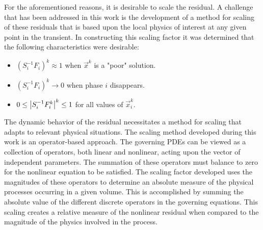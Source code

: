 For the aforementioned reasons, it is desirable to scale the residual.
A challenge that has been addressed in this work is the development of a method for scaling of these residuals that is based upon the local physics of interest at any given point in the transient.
In constructing this scaling factor it was determined that the following characteristics were desirable:

\begin{itemize}
\item{$(S_{i}^{-1} F_i)^{k} \approx 1$ when $\vec{x}^{k}$ is a "poor" solution.}
\item{$(S_{i}^{-1} F_i)^{k} \rightarrow 0$ when phase $i$ disappears.}
\item{$0 \leq \left|S_{i}^{-1} F^{k}_{i}\right|^{k} \leq 1 $ for all values of $\vec{x}^{k}_i$.}
\end{itemize}

The dynamic behavior of the residual necessitates a method for scaling that adapts to relevant physical situations.
The scaling method developed during this work is an operator-based approach.
The governing PDEs can be viewed as a collection of operators, both linear and nonlinear, acting upon the vector of independent parameters.
The summation of these operators must balance to zero for the nonlinear equation to be satisfied.
The scaling factor developed uses the magnitudes of these operators to determine an absolute measure of the physical processes occurring in a given volume.
This is accomplished by summing the absolute value of the different discrete operators in the governing equations.
This scaling creates a relative measure of the nonlinear residual when compared to the magnitude of the physics involved in the process.

